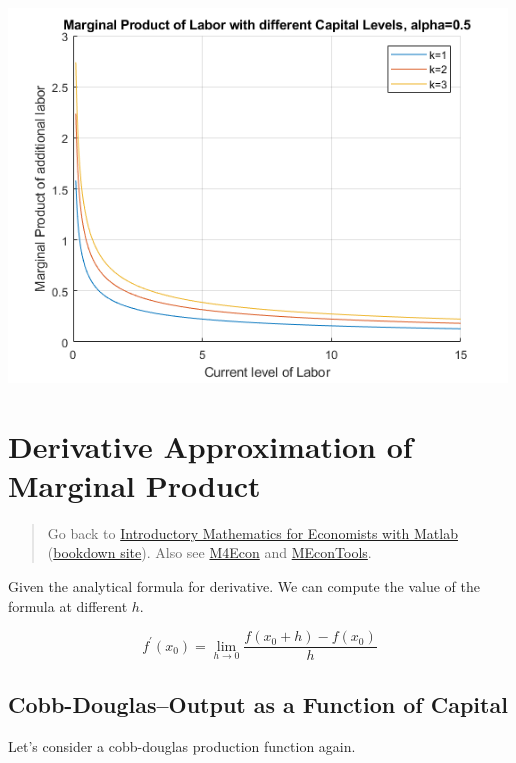 \documentclass[
]{book}
\begin{document}
\includegraphics[width=5.20833in,height=\textheight]{img/derivative_cobb_douglas_images/figure_1.png}

\vspace{1em}

\hypertarget{derivative-approximation-of-marginal-product}{%
\section{Derivative Approximation of Marginal Product}\label{derivative-approximation-of-marginal-product}}

\begin{quote}
Go back to \href{https://math4econ.github.io/}{Introductory Mathematics for Economists with Matlab} (\href{https://math4econ.github.io/bookdown}{bookdown site}). Also see \href{http://fanwangecon.github.io/M4Econ}{M4Econ} and \href{https://fanwangecon.github.io/MEconTools/}{MEconTools}.
\end{quote}

Given the analytical formula for derivative. We can compute the value of
the formula at different \(h\).

\[f^{\prime } (x_0 )=\lim_{h\to 0} \frac{f(x_0 +h)-f(x_0 )}{h}\]

\hypertarget{cobb-douglasoutput-as-a-function-of-capital}{%
\subsection{Cobb-Douglas--Output as a Function of Capital}\label{cobb-douglasoutput-as-a-function-of-capital}}

Let's consider a cobb-douglas production function again.
\end{document}
